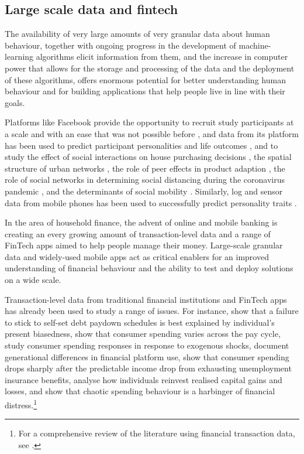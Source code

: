 \subsection{Large scale data and fintech}%
\label{sub:large_scale_data_and_fintech}

The availability of very large amounts of very granular data about human
behaviour, together with ongoing progress in the development of
machine-learning algorithms elicit information from them, and the increase in
computer power that allows for the storage and processing of the data and the
deployment of these algorithms, offers enormous potential for better
understanding human behaviour \citep{jaffe2014big, buyalskaya2021golden} and
for building applications that help people live in line with their goals.

Platforms like Facebook provide the opportunity to recruit study participants
at a scale and with an ease that was not possible before
\citep{kosinski2015facebook}, and data from its platform has been used to
predict participant personalities and life outcomes \citep{youyou2015computer},
and to study the effect of social interactions on house purchasing decisions
\citep{bailey2018economic, bailey2019house}, the spatial structure of urban
networks \citep{bailey2020social}, the role of peer effects in product adaption
\citep{bailey2019peer}, the role of social networks in determining social
distancing during the coronavirus pandemic \citep{bailey2020social}, and the
determinants of social mobility \citep{chetty2022sociali, chetty2022socialii}.
Similarly, log and sensor data from mobile phones has been used to successfully
predict personality traits \citep{montjoye2013predicting,
stachl2020predicting}. 

In the area of household finance, the advent of online and mobile banking is
creating an every growing amount of transaction-level data and a range of
FinTech apps aimed to help people manage their money. Large-scale granular data
and widely-used mobile apps act as critical enablers for an improved
understanding of financial behaviour and the ability to test and deploy
solutions on a wide scale.

Transaction-level data from traditional financial institutions and FinTech apps
has already been used to study a range of issues. For instance,
\citet{kuchler2020sticking} show that a failure to stick to self-set debt
paydown schedules is best explained by individual's present biasedness,
\citet{gelman2014harnessing,olafsson2018liquid} show that consumer spending
varies across the pay cycle, \citet{baker2018debt,baugh2014disentangling} study
consumer spending responses in response to exogenous shocks,
\citet{carlin2019generational} document generational differences in financial
platform use, \citet{ganong2019consumer} show that consumer spending drops
sharply after the predictable income drop from exhausting unemployment
insurance benefits, \citet{meyer2018fully} analyse how individuals reinvest
realised capital gains and losses, and \citet{muggleton2020evidence} show that
chaotic spending behaviour is a harbinger of financial distress.\footnote{For a
comprehensive review of the literature using financial transaction data, see \citet{baker2022household}.}

